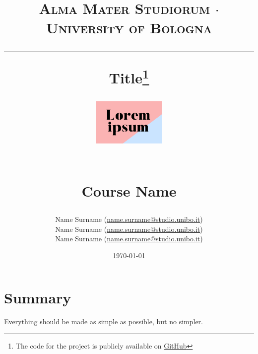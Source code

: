 \documentclass[a4paper,10pt]{report}
\begin{document}
\frenchspacing



\title{
  {{\large{\textsc{Alma Mater Studiorum $\cdot$ University of Bologna}}}}
  \rule{\textwidth}{0.4pt}\vspace{3mm}
  \textbf{Title\footnote{The code for the project is publicly available on \href{https://github.com/}{GitHub}}}
  \begin{figure}[!htb]
    \centering
    \includegraphics[width = 100pt]{lorem}
  \end{figure} \\
  Course Name
}

\author{ Name Surname (\href{mailto:name.surname@studio.unibo.it}{name.surname@studio.unibo.it}) \\ Name Surname (\href{mailto:name.surname@studio.unibo.it}{name.surname@studio.unibo.it}) \\ Name Surname (\href{mailto:name.surname@studio.unibo.it}{name.surname@studio.unibo.it})}
\date{\today}
\maketitle
\newpage
\tableofcontents
\setcounter{tocdepth}{1}
\newpage



\chapter{Summary}\label{chap:introduction}

 \begin{displayquote}Everything should be made as simple as possible, but no simpler.\end{displayquote}

\blindtext %
\end{document}
